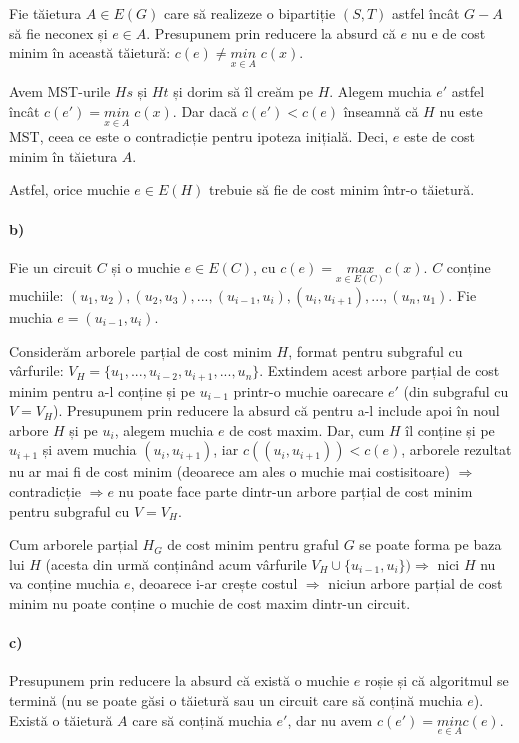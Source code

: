 \documentclass[paper=a4, fontsize=12pt]{scrartcl}
\begin{document}
Fie tăietura $A \in E(G)$ care să realizeze o bipartiție $(S,T)$ astfel încât $G-A$ să fie neconex și $e \in A$. Presupunem prin reducere
la absurd că $e$ nu e de cost minim în această tăietură: $c(e) \neq \underset{x \in A}{min}$ $c(x)$.

Avem MST-urile $Hs$ și $Ht$ și dorim să îl creăm pe $H$. Alegem muchia $e'$ astfel încât $c(e') = \underset{x \in A}{min}$ $c(x)$. Dar dacă
$c(e') < c(e)$ înseamnă că $H$ nu este MST, ceea ce este o contradicție pentru ipoteza inițială. Deci, $e$ este de cost minim în tăietura $A$.

Astfel, orice muchie $e \in E(H)$ trebuie să fie de cost minim într-o tăietură.

\paragraph{b)}
Fie un circuit $C$ și o muchie $e \in E(C)$, cu $c(e) = \underset{x \in E(C)}{max}$$c(x)$. $C$ conține muchiile: $(u_1, u_2), (u_2, u_3), ..., (u_{i-1}, u_i), (u_i, u_{i+1}), ..., (u_n, u_1)$.
Fie muchia $e = (u_{i-1}, u_i)$.

Considerăm arborele parțial de cost minim $H$, format pentru subgraful cu vârfurile: $V_H = \{u_1, ..., u_{i-2}, u_{i+1}, ..., u_n\}$.
Extindem acest arbore parțial de cost minim pentru a-l conține și pe $u_{i-1}$ printr-o muchie oarecare $e'$ (din subgraful cu $V = V_H$).
Presupunem prin reducere la absurd că pentru a-l include apoi în noul arbore $H$ și pe $u_i$, alegem muchia $e$ de cost maxim.
Dar, cum $H$ îl conține și pe $u_{i+1}$ și avem muchia $(u_i, u_{i+1})$, iar $c((u_i, u_{i+1})) < c(e)$, arborele rezultat nu ar mai fi de cost minim 
(deoarece am ales o muchie mai costisitoare) $\Rightarrow$ contradicție $\Rightarrow e$ nu poate face parte dintr-un arbore parțial de cost minim
pentru subgraful cu $V = V_H$.

Cum arborele parțial $H_G$ de cost minim pentru graful $G$ se poate forma pe baza lui $H$ (acesta din urmă conținând acum vârfurile $V_H \cup \{u_{i-1}, u_i\}) \Rightarrow$ nici $H$ nu
va conține muchia $e$, deoarece i-ar crește costul $\Rightarrow$ niciun arbore parțial de cost minim nu poate conține o muchie de cost maxim dintr-un circuit.
\paragraph{c)}
Presupunem prin reducere la absurd că există o muchie $e$ roșie și că algoritmul se termină (nu se poate găsi o tăietură sau un circuit care să conțină muchia $e$).
Există o tăietură $A$ care să conțină muchia $e'$, dar nu avem $c(e') = \underset{e \in A}{min}$$c(e)$.
\end{document}
